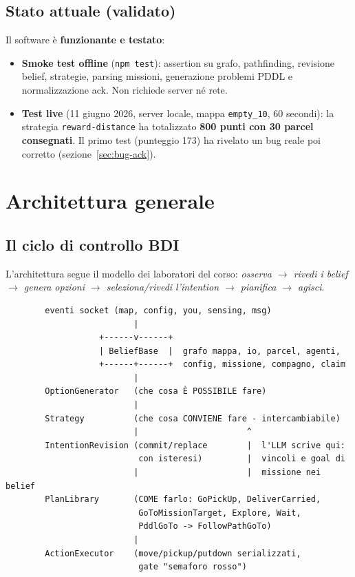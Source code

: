 \documentclass[11pt,a4paper]{article}
\newcommand{\code}[1]{\texttt{#1}}
\begin{document}
\subsection{Stato attuale (validato)}

Il software è \textbf{funzionante e testato}:

\begin{itemize}
  \item \textbf{Smoke test offline} (\code{npm test}): assertion su grafo,
    pathfinding, revisione belief, strategie, parsing missioni, generazione
    problemi PDDL e normalizzazione ack. Non richiede server né rete.
  \item \textbf{Test live} (11 giugno 2026, server locale, mappa
    \code{empty\_10}, 60 secondi): la strategia \code{reward-distance} ha
    totalizzato \textbf{800 punti con 30 parcel consegnati}. Il primo test
    (punteggio 173) ha rivelato un bug reale poi corretto
    (sezione~\ref{sec:bug-ack}).
\end{itemize}

\section{Architettura generale}

\subsection{Il ciclo di controllo BDI}

L'architettura segue il modello dei laboratori del corso: \emph{osserva
$\rightarrow$ rivedi i belief $\rightarrow$ genera opzioni $\rightarrow$
seleziona/rivedi l'intention $\rightarrow$ pianifica $\rightarrow$ agisci}.

\begin{verbatim}
        eventi socket (map, config, you, sensing, msg)
                          |
                   +------v------+
                   | BeliefBase  |  grafo mappa, io, parcel, agenti,
                   +------+------+  config, missione, compagno, claim
                          |
        OptionGenerator   (che cosa È POSSIBILE fare)
                          |
        Strategy          (che cosa CONVIENE fare - intercambiabile)
                          |                      ^
        IntentionRevision (commit/replace        |  l'LLM scrive qui:
                           con isteresi)         |  vincoli e goal di
                          |                      |  missione nei belief
        PlanLibrary       (COME farlo: GoPickUp, DeliverCarried,
                           GoToMissionTarget, Explore, Wait,
                           PddlGoTo -> FollowPathGoTo)
                          |
        ActionExecutor    (move/pickup/putdown serializzati,
                           gate "semaforo rosso")
\end{verbatim}
\end{document}
